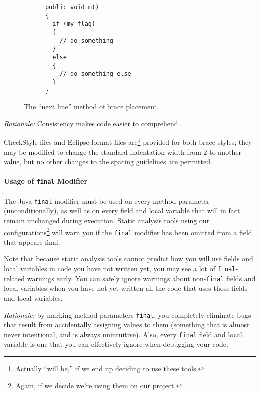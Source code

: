 \begin{itemize}
    \begin{figure}
    \begin{center}
    \begin{minipage}{0.5\textwidth}
    \small
    \begin{lstlisting}
      public void m()
      {
        if (my_flag)
        {
          // do something
        } 
        else
        {
          // do something else
        }
      }
    \end{lstlisting}
    \vspace{-12pt}
    \end{minipage}
    \end{center}
    \caption{The ``next line'' method of brace placement.}
    \label{fig:nextline}
    \end{figure}
    
    \emph{Rationale:} Consistency makes code easier to comprehend.

CheckStyle files and Eclipse format files are\footnote{Actually ``will be,'' if we end up deciding to use these tools.} provided for both brace
styles; they may be modified to change the standard indentation width
from 2 to another value, but no other changes to the spacing
guidelines are permitted.

\end{itemize}

\paragraph{Usage of \texttt{final} Modifier} 
    The Java \texttt{final} modifier must be used on every method
parameter (unconditionally), as well as on every field and local
variable that will in fact remain unchanged during execution. Static analysis tools using our configurations\footnote{Again, if we decide we're using them on our project.} will warn you if the \texttt{final}
modifier has been omitted from a field that appears
final.

Note that because static analysis tools cannot predict how you
will use fields and local variables in code you have not written yet,
you may see a lot of \texttt{final}-related warnings early. You can
safely ignore warnings about non-\texttt{final} fields and local
variables when you have not yet written all the code that uses those
fields and local variables.

    \textit{Rationale:} by marking method parameters \texttt{final}, you completely
eliminate bugs that result from accidentally assigning values to them
(something that is almost never intentional, and is always
unintuitive). Also, every \texttt{final} field and local variable is
one that you can effectively ignore when debugging your code.

